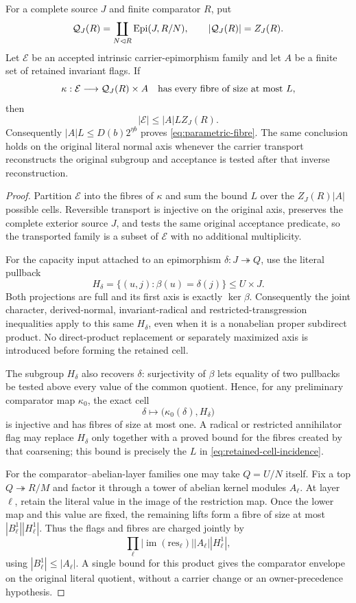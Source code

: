 \begin{lemma}\label{lem:retained-cell-incidence}
For a complete source $J$ and finite comparator $R$, put
\[
 \mathcal Q_J(R)=\coprod_{N\lhd R}\operatorname{Epi}(J,R/N),
 \qquad |\mathcal Q_J(R)|=Z_J(R).
\]
Let $\mathcal E$ be an accepted intrinsic carrier-epimorphism family and
let $A$ be a finite set of retained invariant flags.  If
\[
 \kappa:\mathcal E\longrightarrow\mathcal Q_J(R)\times A
 \quad\hbox{has every fibre of size at most }L,
\]
then
\begin{equation}\label{eq:retained-cell-incidence}
 |\mathcal E|\leq |A|LZ_J(R).
\end{equation}
Consequently $|A|L\leq D(b)2^{\eta b}$ proves
\eqref{eq:parametric-fibre}.  The same conclusion holds on the original
literal normal axis whenever the carrier transport reconstructs the original
subgroup and acceptance is tested after that inverse reconstruction.
\end{lemma}
\begin{proof}
Partition $\mathcal E$ into the fibres of $\kappa$ and sum the bound $L$
over the $Z_J(R)|A|$ possible cells.  Reversible transport is injective on
the original axis, preserves the complete exterior source $J$, and tests the
same original acceptance predicate, so the transported family is a subset
of $\mathcal E$ with no additional multiplicity.

For the capacity input attached to an epimorphism
$\delta:J\twoheadrightarrow Q$, use the literal pullback
\[
 H_\delta=\{(u,j):\beta(u)=\delta(j)\}\leq U\times J.
\]
Both projections are full and its first axis is exactly $\ker\beta$.
Consequently the joint character, derived-normal, invariant-radical and
restricted-transgression inequalities apply to this same $H_\delta$, even
when it is a nonabelian proper subdirect product.  No direct-product
replacement or separately maximized axis is introduced before forming the
retained cell.

The subgroup $H_\delta$ also recovers $\delta$: surjectivity of $\beta$
lets equality of two pullbacks be tested above every value of the common
quotient.  Hence, for any preliminary comparator map $\kappa_0$, the exact
cell
\[
 \delta\longmapsto\bigl(\kappa_0(\delta),H_\delta\bigr)
\]
is injective and has fibres of size at most one.  A radical or restricted
annihilator flag may replace $H_\delta$ only together with a proved bound for
the fibres created by that coarsening; this bound is precisely the $L$ in
\eqref{eq:retained-cell-incidence}.

For the comparator--abelian-layer families one may take $Q=U/N$ itself.
Fix a top $Q\twoheadrightarrow R/M$ and factor it through a tower of abelian
kernel modules $A_\ell$.  At layer $\ell$, retain the literal value in the
image of the restriction map.  Once the lower map and this value are fixed,
the remaining lifts form a fibre of size at most
$|B^1_\ell||H^1_\ell|$.  Thus the flags and fibres are charged jointly by
\[
 \prod_\ell |\operatorname{im}(\mathrm{res}_\ell)|
 |A_\ell||H^1_\ell|,
\]
using $|B^1_\ell|\leq |A_\ell|$.  A single bound for this product gives the
comparator envelope on the original literal quotient, without a carrier
change or an owner-precedence hypothesis.
\end{proof}

